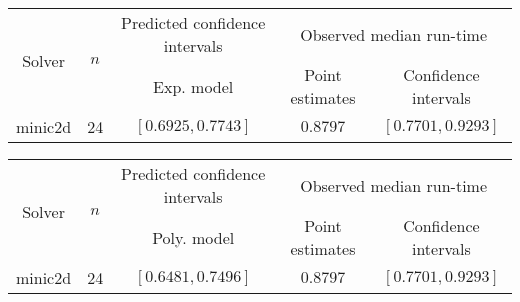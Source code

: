 \begin{tabular}{ccccc}
\hline 
\multirow{2}{*}{Solver} & \multirow{2}{*}{$n$} & Predicted confidence intervals & \multicolumn{2}{c}{Observed median  run-time}\tabularnewline
 &  & Exp. model  & Point estimates  & Confidence intervals\tabularnewline
\hline 
\hline 
\multirow{0}{*}{minic2d} & 24 & $\mathbf{\left[0.6925,0.7743\right]}$ & $0.8797$ & $\left[0.7701,0.9293\right]$ \tabularnewline 
\hline 
\end{tabular} 

\begin{tabular}{ccccc}
\hline 
\multirow{2}{*}{Solver} & \multirow{2}{*}{$n$} & Predicted confidence intervals & \multicolumn{2}{c}{Observed median  run-time}\tabularnewline
 &  & Poly. model  & Point estimates  & Confidence intervals\tabularnewline
\hline 
\hline 
\multirow{0}{*}{minic2d} & 24 & $\left[0.6481,0.7496\right]$ & $0.8797$ & $\left[0.7701,0.9293\right]$ \tabularnewline 
\hline 
\end{tabular} 


